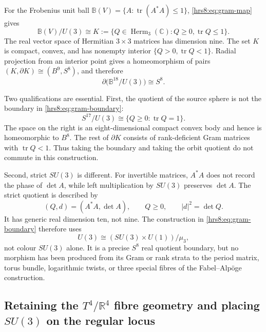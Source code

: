For the Frobenius unit ball
$\mathbb B(V)=\{A:\operatorname{tr}(A^*A)\leq1\}$,
\eqref{hrs8:eq:gram-map} gives
\begin{equation}
 \mathbb B(V)/U(3)
 \cong K:=\{Q\in\operatorname{Herm}_3(\mathbb C):Q\geq0,
             \operatorname{tr}Q\leq1\}.
 \label{hrs8:eq:gram-ball-quotient}
\end{equation}
The real vector space of Hermitian $3\times3$ matrices has dimension nine.
The set $K$ is compact, convex, and has nonempty interior
$\{Q>0,\operatorname{tr}Q<1\}$.  Radial projection from an interior point
gives a homeomorphism of pairs $(K,\partial K)\cong(B^9,S^8)$, and therefore
\begin{equation}
 \boxed{\partial\bigl(\mathbb B^{18}/U(3)\bigr)\cong S^8.}
 \label{hrs8:eq:gram-boundary}
\end{equation}

Two qualifications are essential.  First, the quotient of the source sphere
is not the boundary in \eqref{hrs8:eq:gram-boundary}:
\[
 S^{17}/U(3)\cong\{Q\geq0:\operatorname{tr}Q=1\}.
\]
The space on the right is an eight-dimensional compact convex body and hence
is homeomorphic to $B^8$.  The rest of $\partial K$ consists of
rank-deficient Gram matrices with $\operatorname{tr}Q<1$.  Thus taking the
boundary and taking the orbit quotient do not commute in this construction.

Second, strict $SU(3)$ is different.  For invertible matrices, $A^*A$ does
not record the phase of $\det A$, while left multiplication by $SU(3)$
preserves $\det A$.  The strict quotient is described by
\begin{equation}
 (Q,d)=(A^*A,\det A),
 \qquad Q\geq0,
 \qquad |d|^2=\det Q.
 \label{hrs8:eq:strict-su3-quotient}
\end{equation}
It has generic real dimension ten, not nine.  The construction in
\eqref{hrs8:eq:gram-boundary} therefore uses
\[
 U(3)\cong(SU(3)\times U(1))/\mu_3,
\]
not colour $SU(3)$ alone.  It is a precise $S^8$ real quotient boundary, but
no morphism has been produced from its Gram or rank strata to the period
matrix, torus bundle, logarithmic twists, or three special fibres of the
Fabel--Alp\"oge construction.

\subsection{Retaining the \texorpdfstring{$T^4/\mathbb R^4$}{T4/R4} fibre geometry and placing \texorpdfstring{$SU(3)$}{SU(3)} on the regular locus}
\label{hrs8:subsec:su3-regular-locus}

